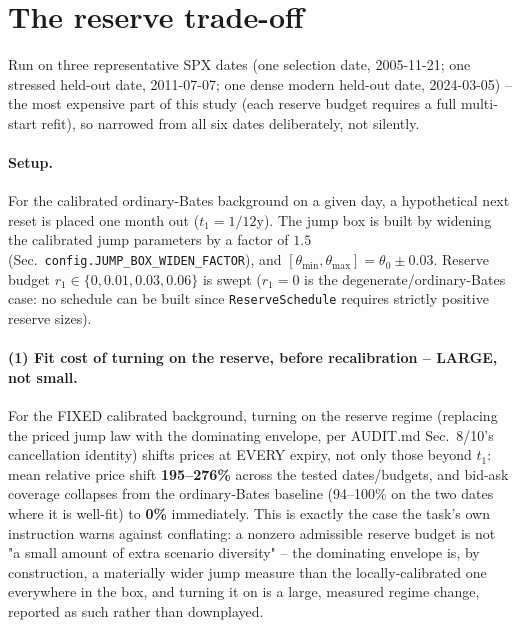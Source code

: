 \section{The reserve trade-off}
\label{sec:reserve-tradeoff}

Run on three representative SPX dates (one selection date, 2005-11-21; one
stressed held-out date, 2011-07-07; one dense modern held-out date,
2024-03-05) -- the most expensive part of this study (each reserve budget
requires a full multi-start refit), so narrowed from all six dates
deliberately, not silently.

\paragraph{Setup.} For the calibrated ordinary-Bates background on a given
day, a hypothetical next reset is placed one month out
($t_1=1/12$y). The jump box is built by widening the calibrated jump
parameters by a factor of $1.5$ (Sec.~\texttt{config.JUMP\_BOX\_WIDEN\_FACTOR}),
and $[\theta_{\min},\theta_{\max}]=\theta_0\pm0.03$. Reserve budget
$r_1\in\{0,0.01,0.03,0.06\}$ is swept ($r_1=0$ is the degenerate/ordinary-Bates
case: no schedule can be built since \texttt{ReserveSchedule} requires
strictly positive reserve sizes).

\paragraph{(1) Fit cost of turning on the reserve, before recalibration --
LARGE, not small.} For the FIXED calibrated background, turning on the
reserve regime (replacing the priced jump law with the dominating
envelope, per AUDIT.md Sec.~8/10's cancellation identity) shifts prices at
EVERY expiry, not only those beyond $t_1$: mean relative price shift
\textbf{195--276\%} across the tested dates/budgets, and bid-ask coverage
collapses from the ordinary-Bates baseline (94--100\% on the two dates
where it is well-fit) to \textbf{0\%} immediately. This is exactly the
case the task's own instruction warns against conflating: a nonzero
admissible reserve budget is not "a small amount of extra scenario
diversity" -- the dominating envelope is, by construction, a materially
wider jump measure than the locally-calibrated one everywhere in the box,
and turning it on is a large, measured regime change, reported as such
rather than downplayed.

